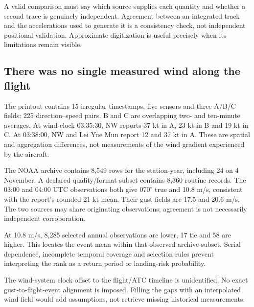 A valid comparison must say which source supplies each quantity and whether a second trace is genuinely independent. Agreement between an integrated track and the accelerations used to generate it is a consistency check, not independent positional validation. Approximate digitization is useful precisely when its limitations remain visible.
\clearpage
\subsection*{There was no single measured wind along the flight}

The printout contains 15 irregular timestamps, five sensors and three A/B/C fields: 225 direction--speed pairs. B and C are overlapping two- and ten-minute averages. At wind-clock 03:35:30, NW reports 37 kt in A, 23 kt in B and 19 kt in C. At 03:38:00, NW and Lei Yue Mun report 12 and 37 kt in A. These are spatial and aggregation differences, not measurements of the wind gradient experienced by the aircraft.

The NOAA archive contains 8,549 rows for the station-year, including 24 on 4 November. A declared quality/format subset contains 8,360 routine records. The 03:00 and 04:00 UTC observations both give $070^\circ$ true and 10.8 m/s, consistent with the report's rounded 21 kt mean. Their gust fields are 17.5 and 20.6 m/s. The two sources may share originating observations; agreement is not necessarily independent corroboration.

At 10.8 m/s, 8,285 selected annual observations are lower, 17 tie and 58 are higher. This locates the event mean within that observed archive subset. Serial dependence, incomplete temporal coverage and selection rules prevent interpreting the rank as a return period or landing-risk probability.

The wind-system clock offset to the flight/ATC timeline is unidentified. No exact gust-to-flight-event alignment is imposed. Filling the gaps with an interpolated wind field would add assumptions, not retrieve missing historical measurements.
\clearpage
